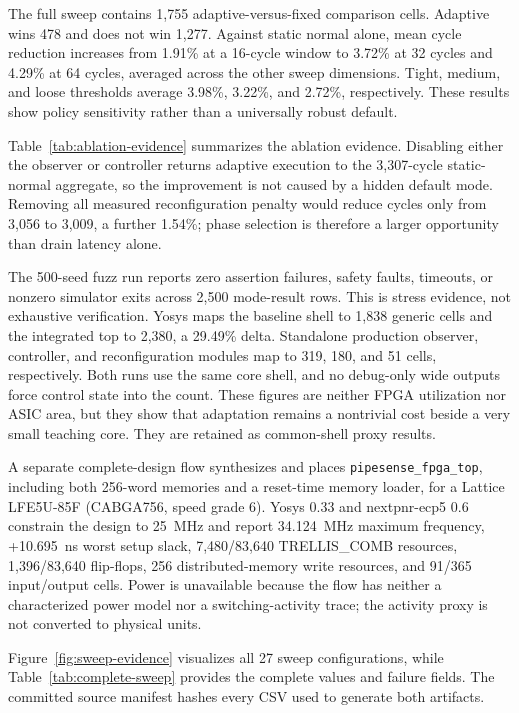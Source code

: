 \documentclass[conference]{IEEEtran}
\begin{document}
The full sweep contains 1,755 adaptive-versus-fixed comparison cells. Adaptive
wins 478 and does not win 1,277. Against static normal alone, mean cycle
reduction increases from 1.91\% at a 16-cycle window to 3.72\% at 32 cycles and
4.29\% at 64 cycles, averaged across the other sweep dimensions. Tight,
medium, and loose thresholds average 3.98\%, 3.22\%, and 2.72\%, respectively.
These results show policy sensitivity rather than a universally robust default.

Table~\ref{tab:ablation-evidence} summarizes the ablation evidence. Disabling either
the observer or controller returns adaptive execution to the 3,307-cycle
static-normal aggregate, so the improvement is not caused by a hidden default
mode. Removing all measured reconfiguration penalty would reduce cycles only
from 3,056 to 3,009, a further 1.54\%; phase selection is therefore a larger
opportunity than drain latency alone.



The 500-seed fuzz run reports zero assertion failures, safety faults, timeouts,
or nonzero simulator exits across 2,500 mode-result rows. This is stress
evidence, not exhaustive verification. Yosys maps the baseline shell to 1,838
generic cells and the integrated top to 2,380, a 29.49\% delta. Standalone
production observer, controller, and reconfiguration modules map to 319, 180,
and 51 cells, respectively. Both runs use the same core shell, and no
debug-only wide outputs force control state into the count. These figures are
neither FPGA utilization nor ASIC area, but they show that adaptation remains
a nontrivial cost beside a very small teaching core. They are retained as
common-shell proxy results.

A separate complete-design flow synthesizes and places \texttt{pipesense\_fpga\_top},
including both 256-word memories and a reset-time memory loader, for a Lattice
LFE5U-85F (CABGA756, speed grade 6). Yosys 0.33 and nextpnr-ecp5 0.6 constrain
the design to 25~MHz and report 34.124~MHz maximum frequency, +10.695~ns worst
setup slack, 7,480/83,640 TRELLIS\_COMB resources, 1,396/83,640 flip-flops,
256 distributed-memory write resources, and 91/365 input/output cells. Power is
unavailable because the flow has neither a characterized power model nor a
switching-activity trace; the activity proxy is not converted to physical
units.

Figure~\ref{fig:sweep-evidence} visualizes all 27 sweep configurations, while
Table~\ref{tab:complete-sweep} provides the complete values and failure fields.
The committed source manifest hashes every CSV used to generate both artifacts.
\end{document}
